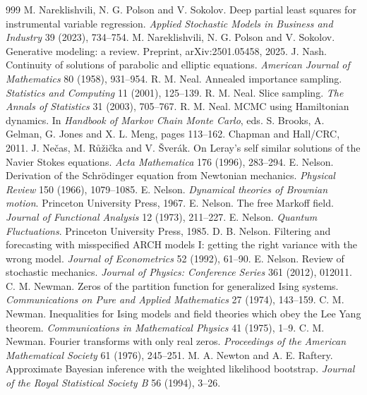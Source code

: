 \begin{thebibliography}{999}
 M. Nareklishvili, N. G. Polson and V. Sokolov. Deep partial least squares for instrumental variable regression. \emph{Applied Stochastic Models in Business and Industry} 39 (2023), 734--754.
 M. Nareklishvili, N. G. Polson and V. Sokolov. Generative modeling: a review. Preprint, arXiv:2501.05458, 2025.
 J. Nash. Continuity of solutions of parabolic and elliptic equations. \emph{American Journal of Mathematics} 80 (1958), 931--954.
 R. M. Neal. Annealed importance sampling. \emph{Statistics and Computing} 11 (2001), 125--139.
 R. M. Neal. Slice sampling. \emph{The Annals of Statistics} 31 (2003), 705--767.
 R. M. Neal. MCMC using Hamiltonian dynamics. In \emph{Handbook of Markov Chain Monte Carlo}, eds. S. Brooks, A. Gelman, G. Jones and X. L. Meng, pages 113--162. Chapman and Hall/CRC, 2011.
 J. Ne\v{c}as, M. R\r{u}\v{z}i\v{c}ka and V. \v{S}ver\'ak. On Leray's self similar solutions of the Navier Stokes equations. \emph{Acta Mathematica} 176 (1996), 283--294.
 E. Nelson. Derivation of the Schr\"odinger equation from Newtonian mechanics. \emph{Physical Review} 150 (1966), 1079--1085.
 E. Nelson. \emph{Dynamical theories of Brownian motion}. Princeton University Press, 1967.
 E. Nelson. The free Markoff field. \emph{Journal of Functional Analysis} 12 (1973), 211--227.
 E. Nelson. \emph{Quantum Fluctuations}. Princeton University Press, 1985.
 D. B. Nelson. Filtering and forecasting with misspecified ARCH models I: getting the right variance with the wrong model. \emph{Journal of Econometrics} 52 (1992), 61--90.
 E. Nelson. Review of stochastic mechanics. \emph{Journal of Physics: Conference Series} 361 (2012), 012011.
 C. M. Newman. Zeros of the partition function for generalized Ising systems. \emph{Communications on Pure and Applied Mathematics} 27 (1974), 143--159.
 C. M. Newman. Inequalities for Ising models and field theories which obey the Lee Yang theorem. \emph{Communications in Mathematical Physics} 41 (1975), 1--9.
 C. M. Newman. Fourier transforms with only real zeros. \emph{Proceedings of the American Mathematical Society} 61 (1976), 245--251.
 M. A. Newton and A. E. Raftery. Approximate Bayesian inference with the weighted likelihood bootstrap. \emph{Journal of the Royal Statistical Society B} 56 (1994), 3--26.

\end{thebibliography}

